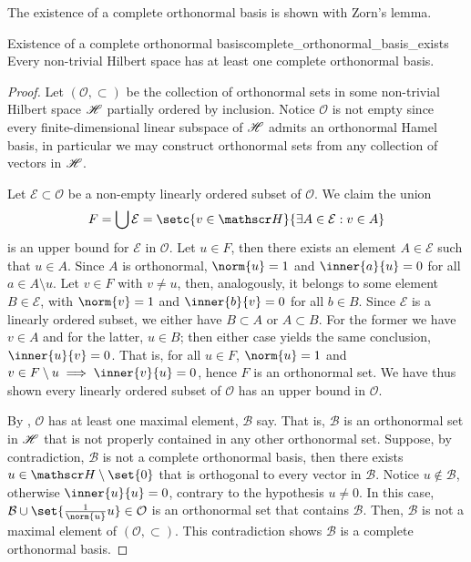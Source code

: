 The existence of a complete orthonormal basis is shown with Zorn's lemma.
\begin{theorem}{Existence of a complete orthonormal basis}{complete_orthonormal_basis_exists}
    Every non-trivial Hilbert space has at least one complete orthonormal basis.
\end{theorem}
\begin{proof}
    Let \((\mathcal{O}, \subset)\) be the collection of orthonormal sets in some non-trivial Hilbert space \(\mathscr{H}\) partially ordered by inclusion. Notice \(\mathcal{O}\) is not empty since every finite-dimensional linear subspace of \(\mathscr{H}\) admits an orthonormal Hamel basis, in particular we may construct orthonormal sets from any collection of vectors in \(\mathscr{H}\).

    Let \(\mathcal{E} \subset \mathcal{O}\) be a non-empty linearly ordered subset of \(\mathcal{O}\). We claim the union
    \begin{equation*}
        F = \bigcup \mathcal{E} = \setc{v \in \hilbert}{\exists A \in \mathcal{E} : v \in A}
    \end{equation*}
    is an upper bound for \(\mathcal{E}\) in \(\mathcal{O}\). Let \(u \in F\), then there exists an element \(A \in \mathcal{E}\) such that \(u \in A\). Since \(A\) is orthonormal, \(\norm{u} = 1\) and \(\inner{a}{u} = 0\) for all \(a \in A \setminus{u}\). Let \(v \in F\) with \(v \neq u\), then, analogously, it belongs to some element \(B \in \mathcal{E}\), with \(\norm{v} = 1\) and \(\inner{b}{v} = 0\) for all \(b \in B\). Since \(\mathcal{E}\) is a linearly ordered subset, we either have \(B \subset A\) or \(A \subset B\). For the former we have \(v \in A\) and for the latter, \(u \in B\); then either case yields the same conclusion, \(\inner{u}{v} = 0\). That is, for all \(u \in F\), \(\norm{u} = 1\) and \(v \in F \setminus{u} \implies \inner{v}{u} = 0\), hence \(F\) is an orthonormal set. We have thus shown every linearly ordered subset of \(\mathcal{O}\) has an upper bound in \(\mathcal{O}\).

    By , \(\mathcal{O}\) has at least one maximal element, \(\mathcal{B}\) say. That is, \(\mathcal{B}\) is an orthonormal set in \(\mathscr{H}\) that is not properly contained in any other orthonormal set. Suppose, by contradiction, \(\mathcal{B}\) is not a complete orthonormal basis, then there exists \(u \in \hilbert\setminus\set{0}\) that is orthogonal to every vector in \(\mathcal{B}\). Notice \(u \notin \mathcal{B}\), otherwise \(\inner{u}{u} = 0\), contrary to the hypothesis \(u \neq 0\). In this case, \(\mathcal{B} \cup \set{\frac{1}{\norm{u}}u} \in \mathcal{O}\) is an orthonormal set that contains \(\mathcal{B}\). Then, \(\mathcal{B}\) is not a maximal element of \((\mathcal{O}, \subset)\). This contradiction shows \(\mathcal{B}\) is a complete orthonormal basis.
\end{proof}

